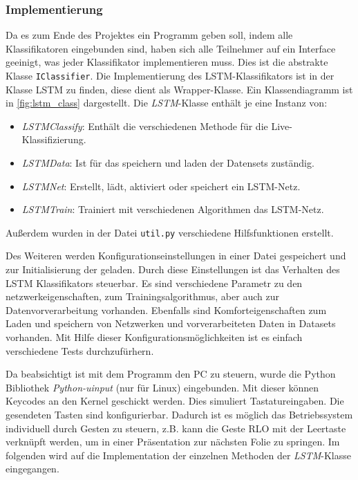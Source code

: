 \subsubsection{Implementierung}
Da es zum Ende des Projektes ein Programm geben soll, indem alle Klassifikatoren
eingebunden sind, haben sich alle Teilnehmer auf ein Interface geeinigt, was
jeder Klassifikator implementieren muss. Dies ist die abstrakte Klasse
\texttt{IClassifier}. Die Implementierung des \ac{LSTM}-Klassifikators ist in
der Klasse LSTM zu finden, diese dient als Wrapper-Klasse. Ein Klassendiagramm
ist in \autoref{fig:lstm_class} dargestellt. Die \textit{LSTM}-Klasse enthält je eine Instanz von: 
\begin{itemize}
\item \textit{LSTMClassify}: Enthält die verschiedenen Methode für die Live-Klassifizierung.
\item \textit{LSTMData}: Ist für das speichern und laden der Datensets zuständig.
\item \textit{LSTMNet}: Erstellt, lädt, aktiviert oder speichert ein LSTM-Netz.
\item \textit{LSTMTrain}: Trainiert mit verschiedenen Algorithmen das LSTM-Netz.
\end{itemize}
Außerdem wurden in der Datei \texttt{util.py} verschiedene Hilfsfunktionen
erstellt.

Des Weiteren werden Konfigurationseinstellungen in einer Datei gespeichert und
zur Initialisierung der geladen. Durch diese Einstellungen ist das Verhalten des
\ac{LSTM} Klassifikators steuerbar. Es sind verschiedene Parametr zu den
netzwerkeigenschaften, zum Trainingsalgorithmus, aber auch zur
Datenvorverarbeitung vorhanden. Ebenfalls sind Komforteigenschaften zum Laden
und speichern von Netzwerken und vorverarbeiteten Daten in Datasets vorhanden.
Mit Hilfe dieser Konfigurationsmöglichkeiten ist es einfach verschiedene Tests
durchzufürhern.

Da beabsichtigt ist mit dem Programm den PC zu steuern, wurde die Python
Bibliothek \textit{Python-uinput} (nur für Linux) eingebunden. Mit dieser können
Keycodes an den Kernel geschickt werden. Dies simuliert Tastatureingaben. Die
gesendeten Tasten sind konfigurierbar. Dadurch ist es möglich das Betriebssystem
individuell durch Gesten zu steuern, z.B. kann die Geste \ac{RLO} mit der
Leertaste verknüpft werden, um in einer Präsentation zur nächsten Folie zu
springen.
Im folgenden wird auf die Implementation der einzelnen Methoden der
\textit{LSTM}-Klasse eingegangen.

